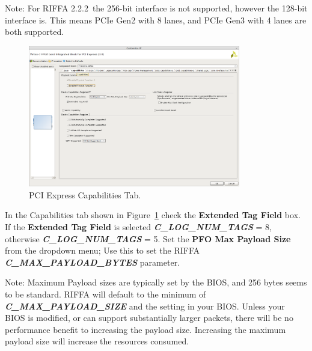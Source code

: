 \documentclass{refrep}
\newcommand{\RIFFAVer}{2.2.2}
\newcommand{\ConfigSetting}[1]{\textbf{#1}}
\newcommand{\RIFFAParameter}[1]{\textit{\textbf{#1}}}
\begin{document}
Note: For RIFFA \RIFFAVer~the 256-bit interface is not supported, however the
128-bit interface is. This means PCIe Gen2 with 8 lanes, and PCIe Gen3 with 4
lanes are both supported.

\begin{figure}[H]
  \includegraphics[width=350px,center]{Gen3IntegratedTabCapabilities.png}
  \caption{PCI Express Capabilities Tab.}
  \label{Fig:Gen3Integrated:Generating:Gen3IntegratedTabCapabilities}
\end{figure}
In the Capabilities tab shown in
Figure~\ref{Fig:Gen3Integrated:Generating:Gen3IntegratedTabCapabilities} check
the \ConfigSetting{Extended Tag Field} box. If the \ConfigSetting{Extended Tag
  Field} is selected \RIFFAParameter{C\_LOG\_NUM\_TAGS} = 8, otherwise
\RIFFAParameter{C\_LOG\_NUM\_TAGS} = 5. Set the \ConfigSetting{PFO Max Payload
  Size} from the dropdown menu; Use this to set the RIFFA
\RIFFAParameter{C\_MAX\_PAYLOAD\_BYTES} parameter.

Note: Maximum Payload sizes are typically set by the BIOS, and 256 bytes seems
to be standard. RIFFA will default to the minimum of
\RIFFAParameter{C\_MAX\_PAYLOAD\_SIZE} and the setting in your BIOS. Unless your
BIOS is modified, or can support substantially larger packets, there will be no
performance benefit to increasing the payload size. Increasing the maximum
payload size will increase the resources consumed.
\end{document}
